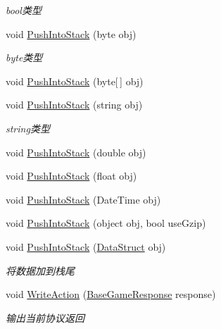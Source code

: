 \begin{DoxyCompactItemize}
\begin{DoxyCompactList}\small\item\em bool类型 \end{DoxyCompactList}\item 
void \mbox{\hyperlink{class_t_net_1_1_service_1_1_game_struct_a2a1b7bfb8631448e059b7831238ee450}{Push\+Into\+Stack}} (byte obj)
\begin{DoxyCompactList}\small\item\em byte类型 \end{DoxyCompactList}\item 
void \mbox{\hyperlink{class_t_net_1_1_service_1_1_game_struct_a084cc9c8e81ed21aae758c73f154e4aa}{Push\+Into\+Stack}} (byte\mbox{[}$\,$\mbox{]} obj)
\item 
void \mbox{\hyperlink{class_t_net_1_1_service_1_1_game_struct_adf474cf33b013f54a65c5536e20b2a50}{Push\+Into\+Stack}} (string obj)
\begin{DoxyCompactList}\small\item\em string类型 \end{DoxyCompactList}\item 
void \mbox{\hyperlink{class_t_net_1_1_service_1_1_game_struct_a19ee9c3248820177ce46ad19081a265b}{Push\+Into\+Stack}} (double obj)
\item 
void \mbox{\hyperlink{class_t_net_1_1_service_1_1_game_struct_a1490ce1fa63a02c53d93ec7110230bef}{Push\+Into\+Stack}} (float obj)
\item 
void \mbox{\hyperlink{class_t_net_1_1_service_1_1_game_struct_a75b50ab2656cae624b4347f2f6b576d0}{Push\+Into\+Stack}} (Date\+Time obj)
\item 
void \mbox{\hyperlink{class_t_net_1_1_service_1_1_game_struct_ad62ff902e17d649836dff2a34aec52b9}{Push\+Into\+Stack}} (object obj, bool use\+Gzip)
\item 
void \mbox{\hyperlink{class_t_net_1_1_service_1_1_game_struct_aca3176bdae2d7f5d5007d39345eaad07}{Push\+Into\+Stack}} (\mbox{\hyperlink{class_t_net_1_1_service_1_1_data_struct}{Data\+Struct}} obj)
\begin{DoxyCompactList}\small\item\em 将数据加到栈尾 \end{DoxyCompactList}\item 
void \mbox{\hyperlink{class_t_net_1_1_service_1_1_game_struct_ab5b7f1b800711d181a76b1497b5e21da}{Write\+Action}} (\mbox{\hyperlink{class_t_net_1_1_service_1_1_base_game_response}{Base\+Game\+Response}} response)
\begin{DoxyCompactList}\small\item\em 输出当前协议返回 \end{DoxyCompactList}\item 

\end{DoxyCompactItemize}
